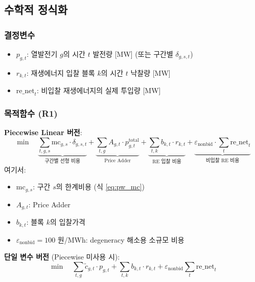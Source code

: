 \documentclass[11pt, a4paper]{article}
\begin{document}
\subsection{수학적 정식화}

\subsubsection{결정변수}

\begin{itemize}[noitemsep]
    \item $p_{g,t}$: 열발전기 $g$의 시간 $t$ 발전량 [MW] (또는 구간별 $\delta_{g,s,t}$)
    \item $r_{k,t}$: 재생에너지 입찰 블록 $k$의 시간 $t$ 낙찰량 [MW]
    \item $\text{re\_net}_t$: 비입찰 재생에너지의 실제 투입량 [MW]
\end{itemize}

\subsubsection{목적함수 (R1)}

\textbf{Piecewise Linear 버전}:
\begin{equation}\label{eq:post_obj}
    \boxed{\min \quad
    \underbrace{\sum_{t,g,s} \text{mc}_{g,s} \cdot \delta_{g,s,t}}_{\text{구간별 선형 비용}}
    + \underbrace{\sum_{t,g} A_{g,t} \cdot p_{g,t}^{\text{total}}}_{\text{Price Adder}}
    + \underbrace{\sum_{t,k} b_{k,t} \cdot r_{k,t}}_{\text{RE 입찰 비용}}
    + \underbrace{\varepsilon_{\text{nonbid}} \cdot \sum_t \text{re\_net}_t}_{\text{비입찰 RE 비용}}}
\end{equation}
여기서:
\begin{itemize}[noitemsep]
    \item $\text{mc}_{g,s}$: 구간 $s$의 한계비용 (식 \eqref{eq:pw_mc})
    \item $A_{g,t}$: Price Adder
    \item $b_{k,t}$: 블록 $k$의 입찰가격
    \item $\varepsilon_{\text{nonbid}} = 100$ 원/MWh: degeneracy 해소용 소규모 비용
\end{itemize}

\textbf{단일 변수 버전} (Piecewise 미사용 시):
\begin{equation}
    \min \quad \sum_{t,g} \tilde{c}_{g,t} \cdot p_{g,t}
    + \sum_{t,k} b_{k,t} \cdot r_{k,t}
    + \varepsilon_{\text{nonbid}} \sum_t \text{re\_net}_t
\end{equation}
\end{document}
